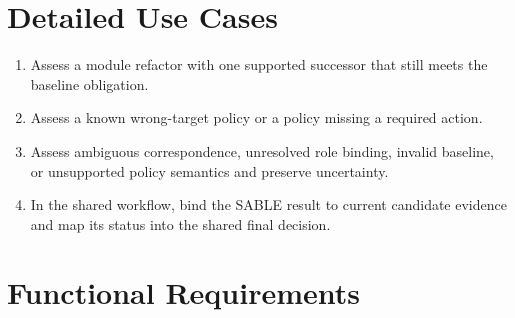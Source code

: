 \section{Detailed Use Cases}
\begin{enumerate}
    \item Assess a module refactor with one supported successor that still meets the baseline obligation.
    \item Assess a known wrong-target policy or a policy missing a required action.
    \item Assess ambiguous correspondence, unresolved role binding, invalid baseline, or unsupported policy semantics and preserve uncertainty.
    \item In the shared workflow, bind the SABLE result to current candidate evidence and map its status into the shared final decision.
\end{enumerate}

\section{Functional Requirements}


